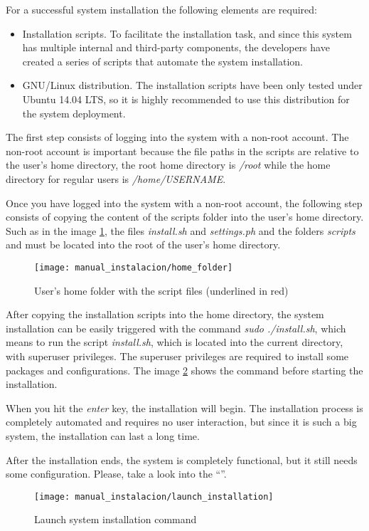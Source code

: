 For a successful system installation the following elements are required:


\begin{itemize}
	\item Installation scripts.  To facilitate the installation task, and since this system has multiple internal and third-party components,  the developers have created a series of scripts that automate the system installation.
	\item GNU/Linux distribution.  The installation scripts have been only tested under Ubuntu 14.04 LTS, so it is highly recommended to use this distribution for the system deployment.
\end{itemize}

The first step consists of logging into the system with a non-root account.  The non-root account is important because the file paths in the scripts are relative to the user's home directory, the root home directory is \textit{/root} while the home directory for regular users is \textit{/home/USERNAME}.

Once you have logged into the system with a non-root account, the following step consists of copying the content of the scripts folder into the user's home directory.  Such as in the image \ref{fig:manual_instalacion_home}, the files \textit{install.sh} and \textit{settings.ph} and the folders \textit{scripts} and  must be located into the root of the user's home directory.

\begin{figure}[h]
	\centering
	\texttt{[image: manual\_instalacion/home\_folder]}
	\caption{User's home folder with the script files (underlined in red)}
	\label{fig:manual_instalacion_home}
\end{figure}

After copying the installation scripts into the home directory, the system installation can be easily triggered with the command \textit{sudo ./install.sh}, which means to run the script \textit{install.sh}, which is located into the current directory, with superuser privileges.  The superuser privileges are required to install some packages and configurations.  The image \ref{fig:manual_instalacion_lanzamiento} shows the command before starting the installation.

When you hit the \textit{enter} key, the installation will begin.  The installation process is completely automated and requires no user interaction, but since it is such a big system, the installation can last a long time.

After the installation ends, the system is completely functional, but it still needs some configuration.  Please, take a look into the ``''.

\begin{figure}[h]
	\centering
	\texttt{[image: manual\_instalacion/launch\_installation]}
	\caption{Launch system installation command}
	\label{fig:manual_instalacion_lanzamiento}
\end{figure}